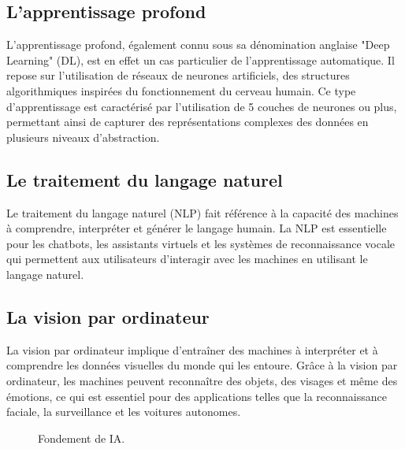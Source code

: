 \subsection{L'apprentissage profond}
L'apprentissage profond, également connu sous sa dénomination anglaise "Deep Learning" (DL), est en effet un cas particulier de l'apprentissage automatique. Il repose sur l'utilisation de réseaux de neurones artificiels, des structures algorithmiques inspirées du fonctionnement du cerveau humain. Ce type d'apprentissage est caractérisé par l'utilisation de 5 couches de neurones ou plus, permettant ainsi de capturer des représentations complexes des données en plusieurs niveaux d'abstraction.

\subsection{Le traitement du langage naturel}
Le traitement du langage naturel (NLP) fait référence à la capacité des machines à comprendre, interpréter et générer le langage humain. La NLP est essentielle pour les chatbots, les assistants virtuels et les systèmes de reconnaissance vocale qui permettent aux utilisateurs d'interagir avec les machines en utilisant le langage naturel.

\subsection{La vision par ordinateur}
La vision par ordinateur implique d’entraîner des machines à interpréter et à comprendre les données visuelles du monde qui les entoure. Grâce à la vision par ordinateur, les machines peuvent reconnaître des objets, des visages et même des émotions, ce qui est essentiel pour des applications telles que la reconnaissance faciale, la surveillance et les voitures autonomes.

\begin{figure}[H]%
    \center%
    \setlength{\fboxsep}{5pt}%
    \setlength{\fboxrule}{0.5pt}%
    \caption{Fondement de IA.}%
\end{figure}


